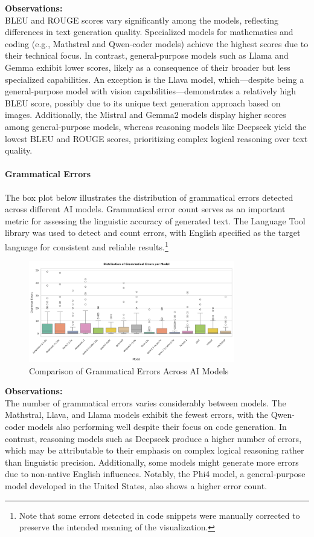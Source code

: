\textbf{Observations:} \\
BLEU and ROUGE scores vary significantly among the models, reflecting differences in text generation quality. Specialized models for mathematics and coding (e.g., Mathstral and Qwen-coder models) achieve the highest scores due to their technical focus. In contrast, general-purpose models such as Llama and Gemma exhibit lower scores, likely as a consequence of their broader but less specialized capabilities. An exception is the Llava model, which—despite being a general-purpose model with vision capabilities—demonstrates a relatively high BLEU score, possibly due to its unique text generation approach based on images. Additionally, the Mistral and Gemma2 models display higher scores among general-purpose models, whereas reasoning models like Deepseek yield the lowest BLEU and ROUGE scores, prioritizing complex logical reasoning over text quality.

\paragraph{Grammatical Errors}

The box plot below illustrates the distribution of grammatical errors detected across different AI models. Grammatical error count serves as an important metric for assessing the linguistic accuracy of generated text. The Language Tool library was used to detect and count errors, with English specified as the target language for consistent and reliable results.\footnote{Note that some errors detected in code snippets were manually corrected to preserve the intended meaning of the visualization.}

\begin{figure}[H]
  \centering
  \includegraphics[width=0.8\textwidth]{figures/scores/grammar_errors.png}
  \caption{Comparison of Grammatical Errors Across AI Models}
  \label{fig:grammar_errors}
\end{figure}

\textbf{Observations:} \\
The number of grammatical errors varies considerably between models. The Mathstral, Llava, and Llama models exhibit the fewest errors, with the Qwen-coder models also performing well despite their focus on code generation. In contrast, reasoning models such as Deepseek produce a higher number of errors, which may be attributable to their emphasis on complex logical reasoning rather than linguistic precision. Additionally, some models might generate more errors due to non-native English influences. Notably, the Phi4 model, a general-purpose model developed in the United States, also shows a higher error count.


